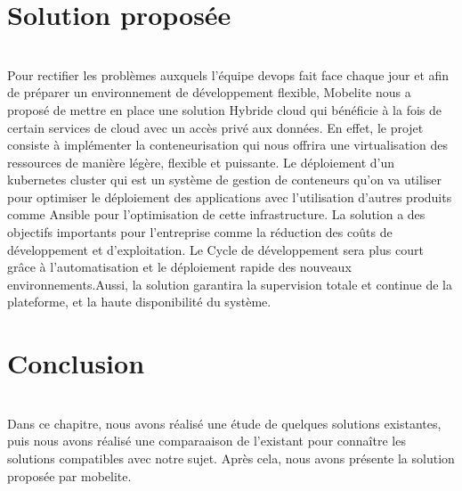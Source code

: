 \section{\LARGE Solution proposée}
\texttt{}\\[0.1cm]
\textsf{\selectfont{} Pour rectifier les problèmes auxquels l’équipe devops fait face chaque jour et afin de  préparer un environnement de développement flexible, Mobelite nous a proposé de mettre en place une solution Hybride cloud qui bénéficie à la fois  de certain services de cloud avec un accès privé aux données. En effet, le projet consiste à implémenter la conteneurisation qui nous offrira une virtualisation des ressources de manière légère, flexible et puissante. Le déploiement d’un kubernetes cluster qui est un système de gestion de conteneurs qu'on va utiliser pour optimiser le déploiement des applications avec l’utilisation d’autres produits comme Ansible pour l’optimisation de cette infrastructure. La solution a des objectifs importants pour l’entreprise comme la réduction des coûts de développement et d'exploitation. Le Cycle de développement sera plus court grâce à l'automatisation et le déploiement rapide des nouveaux environnements.Aussi, la solution garantira la supervision totale et continue de la plateforme, et la haute disponibilité du système.}\\[0.1cm]
\section{\LARGE    Conclusion}
\texttt{}\\[0.3cm]
\textsf{\selectfont{} Dans ce chapitre, nous avons réalisé une étude de quelques solutions existantes, puis nous avons réalisé une comparaaison de l'existant pour connaître les solutions compatibles avec notre sujet. Après cela, nous avons présente la solution proposée par mobelite.
}